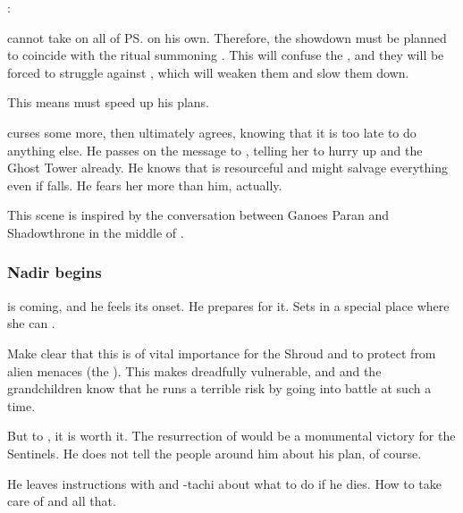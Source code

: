 \begin{garbage}
\begin{prose}
  \Ishnaruchaefir: 
\end{prose}

\Ishnaruchaefir{} cannot take on all of \ps{\Teshrial} \ghobaleth{} on his own. 
Therefore, the showdown must be planned to coincide with the ritual summoning \Nithdornazsh. 
This will confuse the \ghobaleth, and they will be forced to struggle against \Nithdornazsh, which will weaken them and slow them down. 

This means \Psyrex{} must speed up his plans. 

\Psyrex{} curses some more, then ultimately agrees, knowing that it is too late to do anything else. 
He passes on the message to \Nzessuacrith, telling her to hurry up and  the Ghost Tower already. 
He knows that \Achsah{} is resourceful and might salvage everything even if \Teshrial{} falls.
He fears her more than him, actually. 

This scene is inspired by the conversation between Ganoes Paran and Shadowthrone in the middle of \cite{StevenErikson:TheBonehunters}. 





\subsubsection{Nadir begins}
 is coming, and he feels its onset. 
He prepares for it. 
Sets \Rystessakhin{} in a special place where she can . 

Make clear that this is of vital importance for the Shroud and to protect \Miith{} from alien menaces (the \banes). 
This makes \Ishnaruchaefir{} dreadfully vulnerable, and \Criseis{} and the grandchildren know that he runs a terrible risk by going into battle at such a time. 

But to \Ishnaruchaefir, it is worth it. 
The resurrection of \Nithdornazsh{} would be a monumental victory for the Sentinels. 
He does not tell the people around him about his plan, of course. 

He leaves instructions with \Criseis{} and \Thiencaste-tachi about what to do if he dies. 
How to take care of \Rystessakhin{} and all that. 


\end{garbage}
